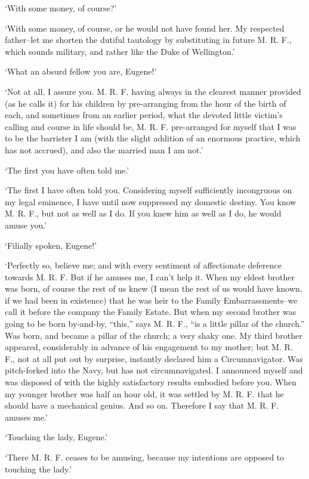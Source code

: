 ‘With some money, of course?’

‘With some money, of course, or he would not have found her. My
respected father--let me shorten the dutiful tautology by substituting
in future M. R. F., which sounds military, and rather like the Duke of
Wellington.’

‘What an absurd fellow you are, Eugene!’

‘Not at all, I assure you. M. R. F. having always in the clearest manner
provided (as he calls it) for his children by pre-arranging from the
hour of the birth of each, and sometimes from an earlier period, what
the devoted little victim’s calling and course in life should be, M. R.
F. pre-arranged for myself that I was to be the barrister I am (with
the slight addition of an enormous practice, which has not accrued), and
also the married man I am not.’

‘The first you have often told me.’

‘The first I have often told you. Considering myself sufficiently
incongruous on my legal eminence, I have until now suppressed my
domestic destiny. You know M. R. F., but not as well as I do. If you
knew him as well as I do, he would amuse you.’

‘Filially spoken, Eugene!’

‘Perfectly so, believe me; and with every sentiment of affectionate
deference towards M. R. F. But if he amuses me, I can’t help it. When my
eldest brother was born, of course the rest of us knew (I mean the rest
of us would have known, if we had been in existence) that he was heir
to the Family Embarrassments--we call it before the company the Family
Estate. But when my second brother was going to be born by-and-by,
“this,” says M. R. F., “is a little pillar of the church.” Was born,
and became a pillar of the church; a very shaky one. My third brother
appeared, considerably in advance of his engagement to my mother; but
M. R. F., not at all put out by surprise, instantly declared him
a Circumnavigator. Was pitch-forked into the Navy, but has not
circumnavigated. I announced myself and was disposed of with the highly
satisfactory results embodied before you. When my younger brother was
half an hour old, it was settled by M. R. F. that he should have a
mechanical genius. And so on. Therefore I say that M. R. F. amuses me.’

‘Touching the lady, Eugene.’

‘There M. R. F. ceases to be amusing, because my intentions are opposed
to touching the lady.’

